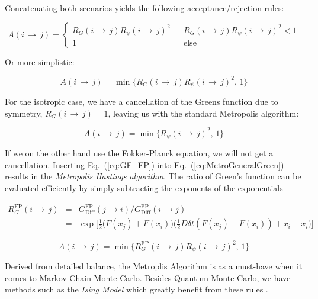 Concatenating both scenarios yields the following acceptance/rejection rules:

\begin{equation}
\label{eq:MetroGeneralGreen}
 A(i\,\rightarrow\,j) = \left\{\begin{array}{ccc}
R_G(i\,\rightarrow\,j)R_\psi(i\,\rightarrow\,j)^2 & & R_G(i\,\rightarrow\,j)R_\psi(i\,\rightarrow\,j)^2 < 1\\
1  & & \mathrm{else}  \end{array}\right. 
\end{equation}

Or more simplistic:

\begin{equation}
  A(i\,\rightarrow\,j) = \min\{R_G(i\,\rightarrow\,j)R_\psi(i\,\rightarrow\,j)^2, \,1\}
\end{equation}


For the isotropic case, we have a cancellation of the Greens function due to symmetry, $R_G(i\,\rightarrow\,j) = 1$, leaving us with the standard Metropolis algorithm:

\begin{equation}
\label{eq:Metropolis_standard}
 A(i\,\rightarrow\,j) = \min\{R_\psi(i\,\rightarrow\,j)^2, \,1\}
\end{equation}

If we on the other hand use the Fokker-Planck equation, we will not get a cancellation. Inserting Eq.~(\ref{eq:GF_FP}) into Eq.~(\ref{eq:MetroGeneralGreen}) results in the \textit{Metropolis Hastings algorithm}. The ratio of Green's function can be evaluated efficiently by simply subtracting the exponents of the exponentials

\begin{eqnarray}
 R_G^\mathrm{FP}(i\,\rightarrow\,j) &=&G_\mathrm{Diff}^\mathrm{FP}(j\,\rightarrow i)/G_\mathrm{Diff}^\mathrm{FP}(i\,\rightarrow j) \nonumber \\
                                    &=& \exp{\Big[\frac{1}{2}\big(F(x_j) + F(x_i)\big)\big(\frac{1}{2}D\delta t(F(x_j) - F(x_i)) + x_i - x_i\big)\Big]}
\end{eqnarray}

\begin{equation}
\label{eq:MetropolisHastings}
 A(i\,\rightarrow\,j) = \min\{R_G^\mathrm{FP}(i\,\rightarrow\,j)R_\psi(i\,\rightarrow\,j)^2, \,1\}
\end{equation}

Derived from detailed balance, the Metroplis Algorithm is as a must-have when it comes to Markov Chain Monte Carlo. Besides Quantum Monte Carlo, we have methods such as the \textit{Ising Model} which greatly benefit from these rules \cite{morten}.

